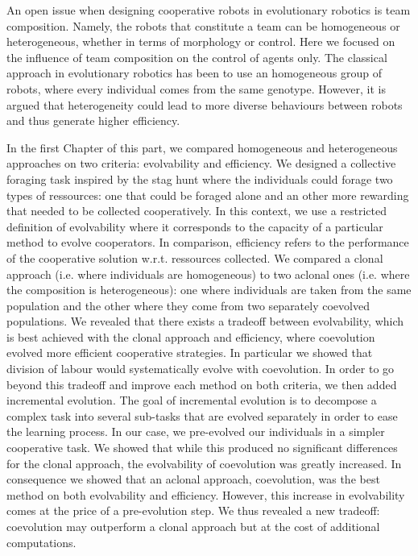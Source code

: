 		An open issue when designing cooperative robots in evolutionary robotics is team composition. Namely, the robots that constitute a team can be homogeneous or heterogeneous, whether in terms of morphology or control. Here we focused on the influence of team composition on the control of agents only. The classical approach in evolutionary robotics has been to use an homogeneous group of robots, where every individual comes from the same genotype. However, it is argued that heterogeneity could lead to more diverse behaviours between robots and thus generate higher efficiency.

		In the first Chapter of this part, we compared homogeneous and heterogeneous approaches on two criteria: evolvability and efficiency. We designed a collective foraging task inspired by the stag hunt where the individuals could forage two types of ressources: one that could be foraged alone and an other more rewarding that needed to be collected cooperatively. In this context, we use a restricted definition of evolvability where it corresponds to the capacity of a particular method to evolve cooperators. In comparison, efficiency refers to the performance of the cooperative solution w.r.t. ressources collected. We compared a clonal approach (i.e. where individuals are homogeneous) to two aclonal ones (i.e. where the composition is heterogeneous): one where individuals are taken from the same population and the other where they come from two separately coevolved populations. We revealed that there exists a tradeoff between evolvability, which is best achieved with the clonal approach and efficiency, where coevolution evolved more efficient cooperative strategies. In particular we showed that division of labour would systematically evolve with coevolution. In order to go beyond this tradeoff and improve each method on both criteria, we then added incremental evolution. The goal of incremental evolution is to decompose a complex task into several sub-tasks that are evolved separately in order to ease the learning process. In our case, we pre-evolved our individuals in a simpler cooperative task. We showed that while this produced no significant differences for the clonal approach, the evolvability of coevolution was greatly increased. In consequence we showed that an aclonal approach, coevolution, was the best method on both evolvability and efficiency. However, this increase in evolvability comes at the price of a pre-evolution step. We thus revealed a new tradeoff: coevolution may outperform a clonal approach but at the cost of additional computations.

